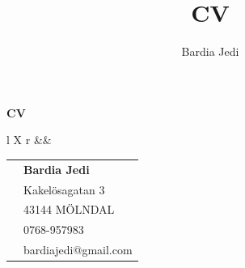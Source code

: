 \documentclass[12pt , a4paper]{article}
\author{Bardia Jedi}
\title{CV}
\begin{document}
	\begin{center}
	{\LARGE \textbf{CV}}
	\end{center}
	
	
	\begin{tabularx}{\textwidth}{ l X r  }				
  		 			&& 
  			\begin{tabular}{ r  l }
					&	\textbf{Bardia Jedi}\\
					&	Kakelösagatan 3\\
					&	43144 MÖLNDAL\\  
  					& 0768-957983\\
  					& bardiajedi@gmail.com \\
 
			\end{tabular}\\
	\end{tabularx}
\end{document}
